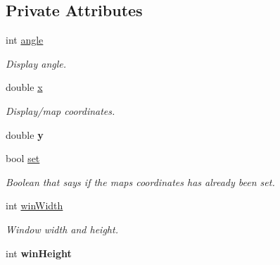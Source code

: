 \subsection*{Private Attributes}
\begin{DoxyCompactItemize}
\item 
int \hyperlink{classTilesettmp_ae77466ee8ef166b63b7a6ffd0ad22c01}{angle}\hypertarget{classTilesettmp_ae77466ee8ef166b63b7a6ffd0ad22c01}{}\label{classTilesettmp_ae77466ee8ef166b63b7a6ffd0ad22c01}

\begin{DoxyCompactList}\small\item\em Display angle. \end{DoxyCompactList}\item 
double \hyperlink{classTilesettmp_aed68240aae13a7be6ae974dac3c76d9f}{x}\hypertarget{classTilesettmp_aed68240aae13a7be6ae974dac3c76d9f}{}\label{classTilesettmp_aed68240aae13a7be6ae974dac3c76d9f}

\begin{DoxyCompactList}\small\item\em Display/map coordinates. \end{DoxyCompactList}\item 
double {\bfseries y}\hypertarget{classTilesettmp_a49c95f09f0461db2fab83b2b8ca139d9}{}\label{classTilesettmp_a49c95f09f0461db2fab83b2b8ca139d9}

\item 
bool \hyperlink{classTilesettmp_a3514c97ecc10fdf685881ccb1449a5c2}{set}\hypertarget{classTilesettmp_a3514c97ecc10fdf685881ccb1449a5c2}{}\label{classTilesettmp_a3514c97ecc10fdf685881ccb1449a5c2}

\begin{DoxyCompactList}\small\item\em Boolean that says if the maps coordinates has already been set. \end{DoxyCompactList}\item 
int \hyperlink{classTilesettmp_adad23274c489e0b7933227ee090e3f24}{win\+Width}\hypertarget{classTilesettmp_adad23274c489e0b7933227ee090e3f24}{}\label{classTilesettmp_adad23274c489e0b7933227ee090e3f24}

\begin{DoxyCompactList}\small\item\em Window width and height. \end{DoxyCompactList}\item 
int {\bfseries win\+Height}\hypertarget{classTilesettmp_a5065a64ac3d8f0e83b6e30699930d781}{}\label{classTilesettmp_a5065a64ac3d8f0e83b6e30699930d781}


\end{DoxyCompactItemize}
